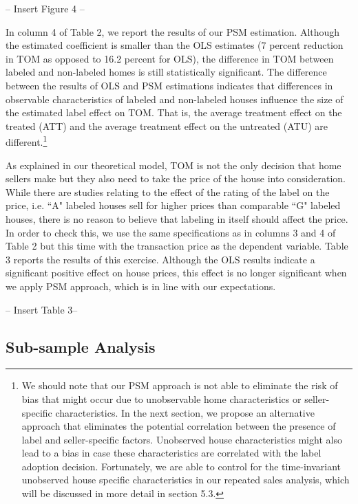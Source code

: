 \documentclass[12pt]{article}
\begin{document}
\begin{center}
-- Insert Figure 4 --
\end{center}


In column 4 of Table 2, we report the results of our PSM estimation. Although the estimated coefficient is smaller than the OLS estimates (7 percent reduction in TOM as opposed to 16.2 percent for OLS), the difference in TOM between labeled and non-labeled homes is still statistically significant. The difference between the results of OLS and PSM estimations indicates that differences in observable characteristics of labeled and non-labeled houses influence the size of the estimated label effect on TOM. That is, the average treatment effect on the treated (ATT) and the average treatment effect on the untreated (ATU) are different.\footnote{We should note that our PSM approach is not able to eliminate the risk of bias that might occur due to unobservable home characteristics or seller-specific characteristics. In the next section, we propose an alternative approach that eliminates the potential correlation between the presence of label and seller-specific factors. Unobserved house characteristics might also lead to a bias in case these characteristics are correlated with the label adoption decision. Fortunately, we are able to control for the time-invariant unobserved house specific characteristics in our repeated sales analysis, which will be discussed in more detail in section 5.3.}

As explained in our theoretical model, TOM is not the only decision that home sellers make but they also need to take the price of the house into consideration. While there are studies relating to the effect of the rating of the label on the price, i.e. ``A" labeled houses sell for higher prices than comparable ``G" labeled houses, there is no reason to believe that labeling in itself should affect the price. In order to check this, we use the same specifications as in columns 3 and 4 of Table 2 but this time with the transaction price as the dependent variable. Table 3 reports the results of this exercise. Although the OLS results indicate a significant positive effect on house prices, this effect is no longer significant when we apply PSM approach, which is in line with our expectations.

\begin{center}
-- Insert Table 3--
\end{center} 

\subsection{Sub-sample Analysis}
\end{document}
